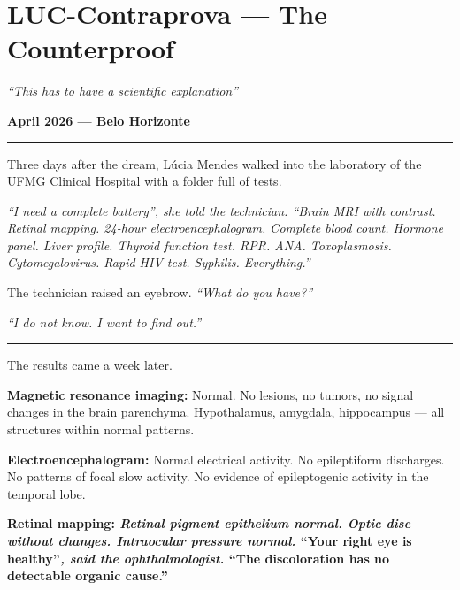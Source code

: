 \section*{\textbf{LUC-Contraprova} --- The Counterproof}

\noindent \textit{\textquotedblleft{}This has to have a scientific explanation\textquotedblright{}}

\noindent \textbf{April 2026 --- Belo Horizonte}

\vspace{0.5em}\noindent\rule{\textwidth}{0.5pt}\vspace{0.5em}

\noindent Three days after the dream, Lúcia Mendes walked into the laboratory of the UFMG Clinical Hospital with a folder full of tests.

\noindent \textit{\textquotedblleft{}I need a complete battery\textquotedblright{}\textit{, she told the technician. }\textquotedblleft{}Brain MRI with contrast. Retinal mapping. 24-hour electroencephalogram. Complete blood count. Hormone panel. Liver profile. Thyroid function test. RPR. ANA. Toxoplasmosis. Cytomegalovirus. Rapid HIV test. Syphilis. Everything.\textquotedblright{}}

\noindent The technician raised an eyebrow. \textit{\textquotedblleft{}What do you have?\textquotedblright{}}

\noindent \textit{\textquotedblleft{}I do not know. I want to find out.\textquotedblright{}}

\vspace{0.5em}\noindent\rule{\textwidth}{0.5pt}\vspace{0.5em}

\noindent The results came a week later.

\noindent \textbf{Magnetic resonance imaging:} Normal. No lesions, no tumors, no signal changes in the brain parenchyma. Hypothalamus, amygdala, hippocampus --- all structures within normal patterns.

\noindent \textbf{Electroencephalogram:} Normal electrical activity. No epileptiform discharges. No patterns of focal slow activity. No evidence of epileptogenic activity in the temporal lobe.

\noindent \textbf{Retinal mapping:\textit{ Retinal pigment epithelium normal. Optic disc without changes. Intraocular pressure normal. }\textquotedblleft{}Your right eye is healthy\textquotedblright{}\textit{, said the ophthalmologist. }\textquotedblleft{}The discoloration has no detectable organic cause.\textquotedblright{}}

